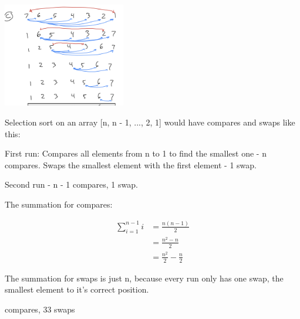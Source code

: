 \documentclass[11pt,largemargins]{homework}
\begin{document}
\begin{alphaparts}
  \includegraphics[width=0.4\textwidth]{pictures/hw1/4c1.png}

  \newpage
  \questionpart
  Selection sort on an array [n, n - 1, ..., 2, 1] would have compares and swaps like this:

  First run: Compares all elements from n to 1 to find the smallest one - n compares.
  Swaps the smallest element with the first element - 1 swap.

  Second run - n - 1 compares, 1 swap.

  The summation for compares:

  \begin{align*}
    \sum_{i = 1}^{n - 1} i &= \frac{n(n - 1)}{2} \\
    &= \frac{n^2 - n}{2} \\
    &= \frac{n^2}{2} - \frac{n}{2}
  \end{align*}

  The summation for swaps is just n, because every run only has one swap, the smallest element to it's correct position.

  \newpage
   compares, 33 swaps


\end{alphaparts}
\end{document}
